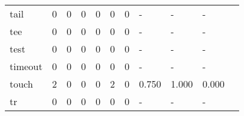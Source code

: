 \begin{longtable}{lp{1.20cm}p{1.20cm}p{1.20cm}p{1.20cm}p{1.20cm}p{1.20cm}p{1.20cm}p{1.20cm}p{1.20cm}p{1.20cm}}
tail      &                                     0 &                                                  0 &                                                  0 &                                                  0 &                                                  0 &                                                  0 &                                             - &                                                  - &                                                  - \\
tee       &                                     0 &                                                  0 &                                                  0 &                                                  0 &                                                  0 &                                                  0 &                                             - &                                                  - &                                                  - \\
test      &                                     0 &                                                  0 &                                                  0 &                                                  0 &                                                  0 &                                                  0 &                                             - &                                                  - &                                                  - \\
timeout   &                                     0 &                                                  0 &                                                  0 &                                                  0 &                                                  0 &                                                  0 &                                             - &                                                  - &                                                  - \\
touch     &                                     2 &                                                  0 &                                                  0 &                                                  0 &                                                  2 &                                                  0 &                                         0.750 &                                              1.000 &                                              0.000 \\
tr        &                                     0 &                                                  0 &                                                  0 &                                                  0 &                                                  0 &                                                  0 &                                             - &                                                  - &                                                  - \\

\end{longtable}
